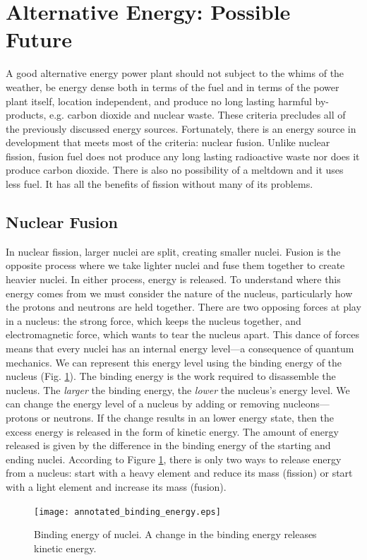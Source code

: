 \section{Alternative Energy: Possible Future}
A good alternative energy power plant should not subject to the whims of the weather, be energy dense both in terms of the fuel and in terms of the power plant itself, location independent, and produce no long lasting harmful by-products, e.g. carbon dioxide and nuclear waste. These criteria precludes all of the previously discussed energy sources. Fortunately, there is an energy source in development that meets most of the criteria: nuclear fusion. Unlike nuclear fission, fusion fuel does not produce any long lasting radioactive waste nor does it produce carbon dioxide. There is also no possibility of a meltdown and it uses less fuel. It has all the benefits of fission without many of its problems.

\subsection{Nuclear Fusion}
In nuclear fission, larger nuclei are split, creating smaller nuclei. Fusion is the opposite process where we take lighter nuclei and fuse them together to create heavier nuclei. In either process, energy is released. To understand where this energy comes from we must consider the nature of the nucleus, particularly how the protons and neutrons are held together. There are two opposing forces at play in a nucleus: the strong force, which keeps the nucleus together, and electromagnetic force, which wants to tear the nucleus apart. This dance of forces means that every nuclei has an internal energy level---a consequence of quantum mechanics.
We can represent this energy level using the binding energy of the nucleus (Fig. \ref{fig:binding_energy}). The binding energy is the work required to disassemble the nucleus. The \textit{larger} the binding energy, the \textit{lower} the nucleus's energy level. We can change the energy level of a nucleus by adding or removing nucleons---protons or neutrons. If the change results in an lower energy state, then the excess energy is released in the form of kinetic energy. The amount of energy released is given by the difference in the binding energy of the starting and ending nuclei. According to Figure \ref{fig:binding_energy}, there is only two ways to release energy from a nucleus: start with a heavy element and reduce its mass (fission) or start with a light element and increase its mass (fusion).
\begin{figure}[h!]
    \centering
    \texttt{[image: annotated\_binding\_energy.eps]}
    \caption{Binding energy of nuclei. A change in the binding energy releases kinetic energy.}
    \label{fig:binding_energy}
\end{figure}

